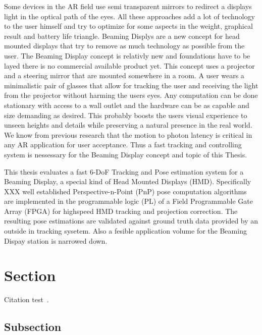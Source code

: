 Some devices in the AR field use semi transparent mirrors to redirect a displays light in the optical path of the eyes.
All these approaches add a lot of technology to the user himself and try to optimize for some aspects in the weight, graphical result and battery life triangle.
Beaming Displys are a new concept for head mounted displays that try to remove as much technology as possible from the user.
The Beaming Display concept is relativly new and foundations have to be layed there is no commercial available product yet.
This concept uses a projector and a steering mirror that are mounted somewhere in a room.
A user wears a minimalistic pair of glasses that allow for tracking the user and receiving the light from the projector without harming the users eyes.
Any computation can be done stationary with access to a wall outlet and the hardware can be as capable and size demanding as desired.
This probably boosts the users visual experience to unseen heights and details while preserving a natural presence in the real world.
We know from previous research that the motion to photon latency is critical in any AR application for user acceptance.
Thus a fast tracking and controlling system is nessessary for the Beaming Display concept and topic of this Thesis.

This thesis evaluates a fast 6-DoF Tracking and Pose estimation system for a Beaming Display, a special kind of Head Mounted Displays (HMD).
Specifically XXX well established Perspective-n-Point (PnP) pose computation algorithms are implemented in the programmable logic (PL) of a Field Programmable Gate Array (FPGA) for highspeed HMD tracking and projection correction.
The resulting pose estimations are validated against ground truth data provided by an outside in tracking sysetem.
Also a fesible application volume for the Beaming Dispay station is narrowed down.

\section{Section}
Citation test~\parencite{latex}.

\subsection{Subsection}


